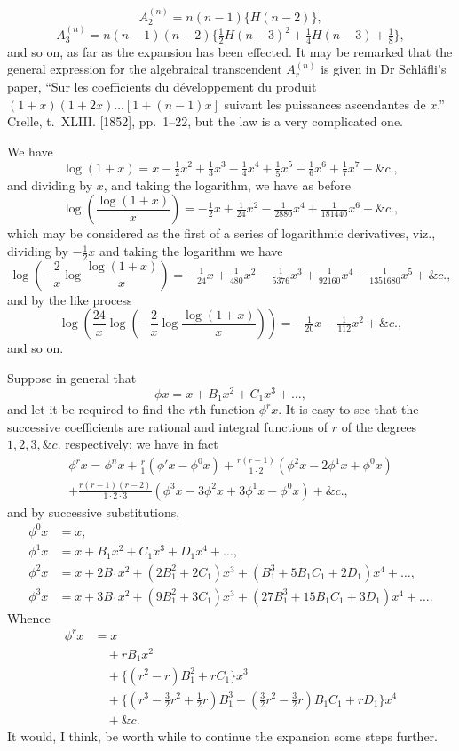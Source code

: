 \documentclass[11pt,a4paper]{article}
\theoremstyle{plain}
\begin{document}
\[
A_2^{(n)} = n(n-1)\{H(n-2)\},
\]
\[
A_3^{(n)} = n(n-1)(n-2)\{\tfrac{1}{2}H(n-3)^2 + \tfrac{1}{4}H(n-3) + \tfrac{1}{8}\},
\]
and so on, as far as the expansion has been effected. It may be remarked that the general expression for the algebraical transcendent $A_r^{(n)}$ is given in Dr Schl\"{a}fli's paper, ``Sur les coefficients du d\'{e}veloppement du produit $(1+x)(1+2x)\ldots[1+(n-1)x]$ suivant les puissances ascendantes de $x$.'' Crelle, t.~XLIII. [1852], pp.~1--22, but the law is a very complicated one.

We have
\[
\log(1+x) = x - \tfrac{1}{2}x^2 + \tfrac{1}{3}x^3 - \tfrac{1}{4}x^4 + \tfrac{1}{5}x^5 - \tfrac{1}{6}x^6 + \tfrac{1}{7}x^7 - \&c.,
\]
and dividing by $x$, and taking the logarithm, we have as before
\[
\log\left(\frac{\log(1+x)}{x}\right) = -\tfrac{1}{2}x + \tfrac{1}{24}x^2 - \tfrac{1}{2880}x^4 + \tfrac{1}{181440}x^6 - \&c.,
\]
which may be considered as the first of a series of logarithmic derivatives, viz., dividing by $-\tfrac{1}{2}x$ and taking the logarithm we have
\[
\log\left(-\frac{2}{x}\log\frac{\log(1+x)}{x}\right) = -\tfrac{1}{24}x + \tfrac{1}{480}x^2 - \tfrac{1}{5376}x^3 + \tfrac{1}{92160}x^4 - \tfrac{1}{1351680}x^5 + \&c.,
\]
and by the like process
\[
\log\left(\frac{24}{x}\log\left(-\frac{2}{x}\log\frac{\log(1+x)}{x}\right)\right) = -\tfrac{1}{20}x - \tfrac{1}{112}x^2 + \&c.,
\]
and so on.

Suppose in general that
\[
\phi x = x + B_1x^2 + C_1x^3 + \ldots,
\]
and let it be required to find the $r$th function $\phi^r x$. It is easy to see that the successive coefficients are rational and integral functions of $r$ of the degrees $1, 2, 3, \&c$. respectively; we have in fact
\begin{multline*}
\phi^r x = \phi^n x + \frac{r}{1}(\phi' x - \phi^0 x) + \frac{r(r-1)}{1\cdot 2}(\phi^2 x - 2\phi^1 x + \phi^0 x)\\
+ \frac{r(r-1)(r-2)}{1\cdot 2\cdot 3}(\phi^3 x - 3\phi^2 x + 3\phi^1 x - \phi^0 x) + \&c.,
\end{multline*}
and by successive substitutions,
\begin{align*}
\phi^0 x &= x,\\
\phi^1 x &= x + B_1x^2 + C_1x^3 + D_1x^4 + \ldots,\\
\phi^2 x &= x + 2B_1x^2 + (2B_1^2 + 2C_1)x^3 + (B_1^3 + 5B_1C_1 + 2D_1)x^4 + \ldots,\\
\phi^3 x &= x + 3B_1x^2 + (9B_1^2 + 3C_1)x^3 + (27B_1^3 + 15B_1C_1 + 3D_1)x^4 + \ldots.
\end{align*}
Whence
\begin{align*}
\phi^r x &= x\\
&\quad + rB_1x^2\\
&\quad + \{(r^2 - r)B_1^2 + rC_1\}x^3\\
&\quad + \{(r^3 - \tfrac{3}{2}r^2 + \tfrac{1}{2}r)B_1^3 + (\tfrac{3}{2}r^2 - \tfrac{3}{2}r)B_1C_1 + rD_1\}x^4\\
&\quad + \&c.
\end{align*}
It would, I think, be worth while to continue the expansion some steps further.
\end{document}
